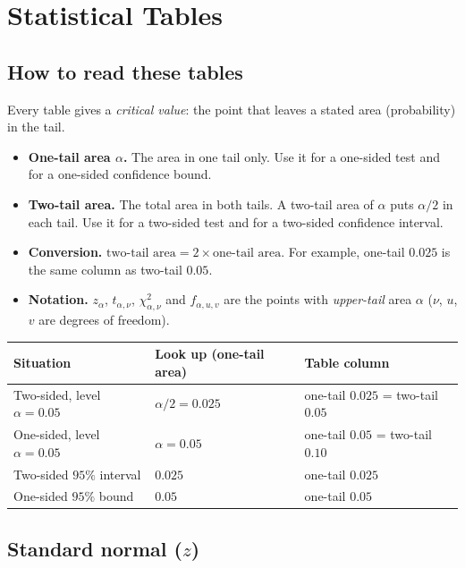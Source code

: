 \chapter{Statistical Tables}

\section{How to read these tables}

Every table gives a \emph{critical value}: the point that leaves a stated area (probability) in the tail.

\begin{itemize}
  \item \textbf{One-tail area $\alpha$.} The area in one tail only. Use it for a one-sided test and for a one-sided confidence bound.
  \item \textbf{Two-tail area.} The total area in both tails. A two-tail area of $\alpha$ puts $\alpha/2$ in each tail. Use it for a two-sided test and for a two-sided confidence interval.
  \item \textbf{Conversion.} $\text{two-tail area}=2\times\text{one-tail area}$. For example, one-tail $0.025$ is the same column as two-tail $0.05$.
  \item \textbf{Notation.} $z_\alpha$, $t_{\alpha,\nu}$, $\chi^2_{\alpha,\nu}$ and $f_{\alpha,u,v}$ are the points with \emph{upper-tail} area $\alpha$ ($\nu$, $u$, $v$ are degrees of freedom).
\end{itemize}

\begin{center}
\small
\begin{tabular}{p{3.4cm}p{3.6cm}p{4.4cm}}
\toprule
Situation & Look up (one-tail area) & Table column \\
\midrule
Two-sided, level $\alpha=0.05$ & $\alpha/2=0.025$ & one-tail $0.025$ = two-tail $0.05$ \\
One-sided, level $\alpha=0.05$ & $\alpha=0.05$ & one-tail $0.05$ = two-tail $0.10$ \\
Two-sided $95\%$ interval & $0.025$ & one-tail $0.025$ \\
One-sided $95\%$ bound & $0.05$ & one-tail $0.05$ \\
\bottomrule
\end{tabular}
\end{center}

\section{Standard normal ($z$)}

